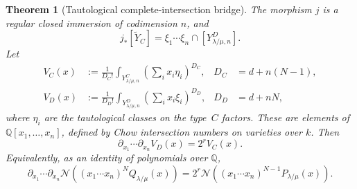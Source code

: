 \documentclass[11pt,a4paper,oneside]{amsart}
\numberwithin{equation}{section}
\newtheorem{theorem}{Theorem}[section]
\theoremstyle{definition}
\theoremstyle{remark}
\newcommand{\cN}{\mathcal N}
\begin{document}
\begin{theorem}[Tautological complete-intersection bridge]
\label{appA:thm:projective-bundle-bridge}
The morphism $j$ is a regular closed immersion of codimension $n$, and
\begin{equation}
\label{appA:eq:bridge-cycle}
  j_*[\widetilde Y_C]
  =\xi_1\cdots\xi_n\cap[Y^D_{\lambda/\mu,n}].
\end{equation}
Let
\begin{align*}
  V_C(x)&:=\frac{1}{D_C!}
  \int_{Y^C_{\lambda/\mu,n}}
  \left(\sum_i x_i\eta_i\right)^{D_C},
  &D_C&=d+n(N-1),\\
  V_D(x)&:=\frac{1}{D_D!}
  \int_{Y^D_{\lambda/\mu,n}}
  \left(\sum_i x_i\xi_i\right)^{D_D},
  &D_D&=d+nN,
\end{align*}
where $\eta_i$ are the tautological classes on the type~$C$ factors.  These
are elements of $\mathbb Q[x_1,\ldots,x_n]$, defined by Chow intersection
numbers on varieties over $k$.  Then
\begin{equation}
\label{appA:eq:volume-bridge}
  \partial_{x_1}\cdots\partial_{x_n}V_D(x)=2^rV_C(x).
\end{equation}
Equivalently, as an identity of polynomials over $\mathbb Q$,
\begin{equation}
\label{appA:eq:normalized-bridge}
  \partial_{x_1}\cdots\partial_{x_n}
  \cN\!\left((x_1\cdots x_n)^NQ_{\lambda/\mu}(x)\right)
  =2^r\cN\!\left((x_1\cdots x_n)^{N-1}
  P_{\lambda/\mu}(x)\right).
\end{equation}
\end{theorem}
\end{document}
